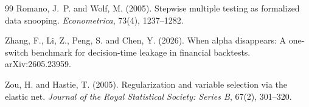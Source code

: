 \documentclass[11pt]{article}
\begin{document}
\begin{thebibliography}{99}
Romano, J.\ P. and Wolf, M. (2005).
Stepwise multiple testing as formalized data snooping.
\emph{Econometrica}, 73(4), 1237--1282.

Zhang, F., Li, Z., Peng, S. and Chen, Y. (2026).
When alpha disappears: A one-switch benchmark for decision-time leakage in financial backtests.
arXiv:2605.23959.

Zou, H. and Hastie, T. (2005).
Regularization and variable selection via the elastic net.
\emph{Journal of the Royal Statistical Society: Series B}, 67(2), 301--320.

\end{thebibliography}
\end{document}
